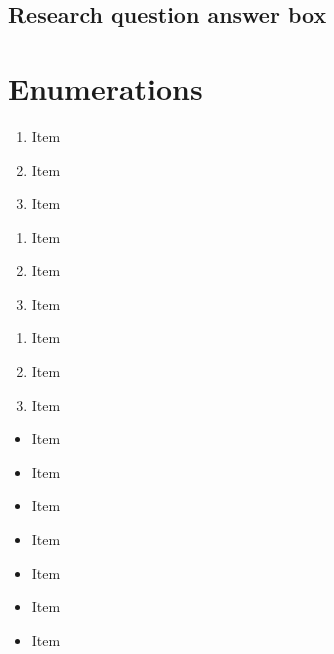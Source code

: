 
\subsection{Research question answer box}

\newpage


\section{Enumerations}

\begin{enumerate}[label=\Alph*.]
    \item Item \label{item:item_A}
    \item Item
    \item Item
\end{enumerate}
\bigbreak

\begin{enumerate}[label=\Alph*)]
    \item Item
    \item Item
    \item Item
\end{enumerate}
\bigbreak

\begin{enumerate}
    \item Item
    \item Item
    \item Item
\end{enumerate}
\bigbreak

\begin{itemize}
    \item[$\circ$] Item
    \item[$\bigcirc$] Item
    \item[$\blacksquare$] Item
    \item[$\square$] Item
\end{itemize}
\bigbreak
\begin{itemize}
    \item Item
    \item Item
    \item Item
\end{itemize}
\bigbreak

